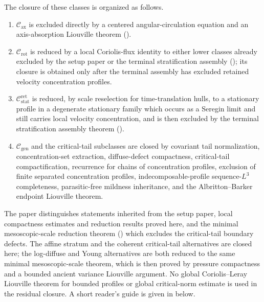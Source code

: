 \documentclass[11pt]{amsart}
\numberwithin{equation}{section}
\theoremstyle{plain}
\theoremstyle{definition}
\theoremstyle{remark}
\newcommand{\Cax}{\mathcal C_{\mathrm{ax}}}
\newcommand{\Crot}{\mathcal C_{\mathrm{rot}}}
\newcommand{\Cstat}{\mathcal C_{\mathrm{stat}}^{\mathrm{ret}}}
\newcommand{\Cgen}{\mathcal C_{\mathrm{gen}}}
\begin{document}
The closure of these classes is organized as follows.
\begin{enumerate}[label=\textup{(\arabic*)},leftmargin=2.2em]
   \item \(\Cax\) is excluded directly by a centered angular-circulation
   equation and an axis-absorption Liouville theorem
   ().
   \item \(\Crot\) is reduced by a local Coriolis-flux identity to either
   lower classes already excluded by the setup paper or the terminal stratification assembly
   (); its closure is obtained only
   after the terminal assembly has excluded retained velocity concentration
   profiles.
   \item \(\Cstat\) is reduced, by scale reselection for time-translation
   hulls, to a stationary profile in a degenerate stationary family which
   occurs as a Seregin limit and still carries local velocity concentration,
   and is then excluded by the terminal stratification assembly theorem
   ().
   \item \(\Cgen\) and the critical-tail subclasses are closed by covariant
   tail normalization, concentration-set extraction, diffuse-defect
   compactness, critical-tail compactification, recurrence for chains of
   concentration profiles, exclusion of finite separated concentration
   profiles, indecomposable-profile sequence-\(L^3\) completeness,
   parasitic-free mildness inheritance, and the Albritton--Barker endpoint
   Liouville theorem.
\end{enumerate}
The paper distinguishes statements inherited from the setup paper, local
compactness estimates and reduction results proved here, and the minimal
mesoscopic-scale reduction theorem
() which excludes the
critical-tail boundary defects.  The affine stratum and the coherent
critical-tail alternatives are closed here; the log-diffuse and Young
alternatives are both reduced to the same minimal mesoscopic-scale theorem,
which is then proved by pressure compactness and a bounded ancient variance
Liouville argument.  No global Coriolis--Leray Liouville theorem for bounded
profiles or global critical-norm estimate is used in the residual closure.
A short reader's guide is given in  below.
\end{document}
